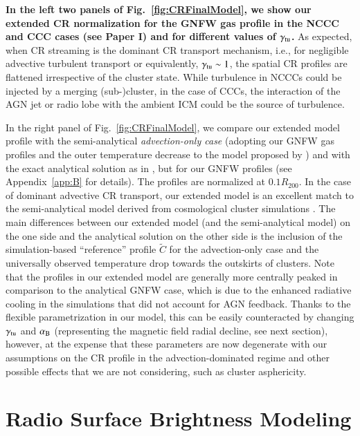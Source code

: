 \documentclass[useAMS,usenatbib]{mn2e}
\begin{document}
{\bf In the left two panels of Fig.~\ref{fig:CRFinalModel}, we show our extended CR 
normalization for the GNFW gas profile in the NCCC and CCC cases (see Paper I) 
and for different values of $\gamma_{{\mathrm{tu}}}$.}  
As expected, when CR streaming is the dominant CR
transport mechanism, i.e., for negligible advective turbulent transport or
equivalently, $\gamma_{{\mathrm{tu}}}\sim1$, the spatial CR profiles are flattened
irrespective of the cluster state. While turbulence in NCCCs could be
injected by a merging (sub-)cluster, in the case of CCCs, the interaction of the
AGN jet or radio lobe with the ambient ICM could be the source of turbulence.

In the right panel of Fig.~\ref{fig:CRFinalModel}, we compare our extended model
profile with the semi-analytical {\em advection-only case} (adopting our GNFW
gas profiles and the outer temperature decrease to the model proposed by
\citealp{2010MNRAS.409..449P}) and with the exact analytical solution as in
\citet{2011A&A...527A..99E}, but for our GNFW profiles (see Appendix~\ref{app:B}
for details).  The profiles are normalized at $0.1 R_{200}$. In the case of
dominant advective CR transport, our extended model is an excellent match to the
semi-analytical model derived from cosmological cluster simulations
\citep{2010MNRAS.409..449P}.  The main differences between our extended model
(and the semi-analytical model) on the one side and the analytical solution on
the other side is the inclusion of the simulation-based ``reference'' profile
$\tilde{C}$ for the advection-only case and the universally observed temperature
drop towards the outskirts of clusters. Note that the profiles in our extended
model are generally more centrally peaked in comparison to the analytical GNFW
case, which is due to the enhanced radiative cooling in the
\citet{2010MNRAS.409..449P} simulations that did not account for AGN
feedback. Thanks to the flexible parametrization in our model, this can be
easily counteracted by changing $\gamma_{{\mathrm{tu}}}$ and $ \alpha_{{\mathrm{B}}}$
(representing the magnetic field radial decline, see next section), however, at
the expense that these parameters are now degenerate with our assumptions on the
CR profile in the advection-dominated regime and other possible effects that we
are not considering, such as cluster asphericity.


\section{Radio Surface Brightness Modeling}
\label{sec:3}
\end{document}

